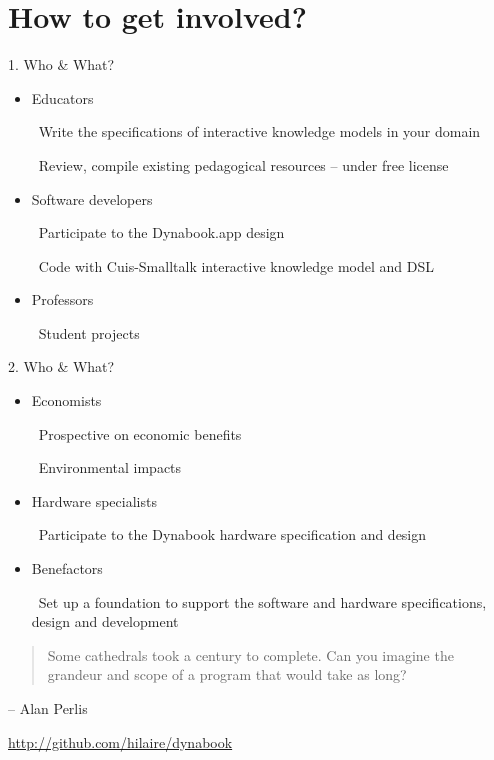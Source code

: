 \documentclass{beamer}
\newcommand{\tip}{\boldmath{\textcolor{red}{$\Rightarrow$}}}
\begin{document}
\section{How to get involved?}
\begin{frame}{1. Who \& What?}
  \begin{itemize}
  \item Educators

    \tip\ Write the specifications of interactive knowledge models in
    your domain

    \tip\ Review, compile existing pedagogical resources -- under free
    license
  \vspace*{10pt}

  \item Software developers

    \tip\ Participate to the Dynabook.app design
    
    \tip\ Code with Cuis-Smalltalk interactive knowledge model and DSL
  \vspace*{10pt}
    
  \item Professors

    \tip\ Student projects
  \end{itemize}
\end{frame}
%
\begin{frame}{2. Who \& What?}
  \begin{itemize}
  \item Economists

    \tip\ Prospective on economic benefits

    \tip\ Environmental impacts
  \vspace*{10pt}

  \item Hardware specialists

    \tip\ Participate to the Dynabook hardware specification and
    design
  \vspace*{10pt}

  \item Benefactors

    \tip\ Set up a foundation to support the software and hardware
    specifications, design and development
    
  \end{itemize}
\end{frame}
%
\begin{frame}
  \begin{quote}
    Some cathedrals took a century to complete. Can you imagine the
    grandeur and scope of a program that would take as long?
  \end{quote}
  \begin{flushright}
    -- Alan Perlis
  \end{flushright}
  \begin{center}
    \url{http://github.com/hilaire/dynabook}
  \end{center}
\end{frame}
\end{document}
